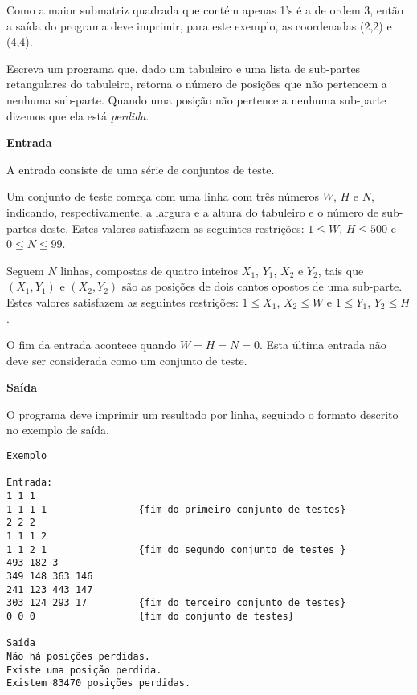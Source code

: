 Como a maior submatriz quadrada que contém apenas 1's é a de ordem 3,
então a saída do programa deve imprimir, para este exemplo, as coordenadas
(2,2) e (4,4).



\item Escreva um programa que, dado um tabuleiro e uma lista de sub-partes 
retangulares do tabuleiro, retorna o número de posições que não pertencem 
a nenhuma sub-parte. Quando uma posição não pertence a nenhuma sub-parte
dizemos que ela está \emph{perdida}.

\vspace*{\baselineskip}

\begin{center}
\textbf{Entrada}
\end{center}


A entrada consiste de uma série de conjuntos de teste. 

Um conjunto de teste começa com uma linha com três números $W$, $H$ e $N$, 
indicando, respectivamente, a largura e a altura do tabuleiro 
e o número de sub-partes deste. 
%
Estes valores satisfazem as seguintes restrições: 
$1 \leq W$, $H \leq 500$ e $0 \leq N \leq 99$. 

Seguem $N$ linhas, compostas de quatro inteiros 
$X_1$, $Y_1$, $X_2$ e $Y_2$, 
tais que $(X_1, Y_1)$ e $(X_2, Y_2)$ 
são as posições de dois cantos opostos de uma sub-parte. 
%
Estes valores satisfazem as seguintes restrições: 
$1 \leq X_1$, $X_2 \leq W$ e $1 \leq Y_1$, $Y_2 \leq H$. 

O fim da entrada acontece quando $W=H=N=0$. 
Esta última entrada não deve ser considerada como um conjunto de teste.

\begin{center}
\textbf{Saída}
\end{center}

O programa deve imprimir um resultado por linha, seguindo o formato 
descrito no exemplo de saída.

\begin{verbatim}
Exemplo

Entrada:
1 1 1
1 1 1 1                {fim do primeiro conjunto de testes}
2 2 2
1 1 1 2
1 1 2 1                {fim do segundo conjunto de testes }
493 182 3
349 148 363 146
241 123 443 147
303 124 293 17         {fim do terceiro conjunto de testes}
0 0 0                  {fim do conjunto de testes}

Saída
Não há posições perdidas. 
Existe uma posição perdida.
Existem 83470 posições perdidas.
\end{verbatim}


